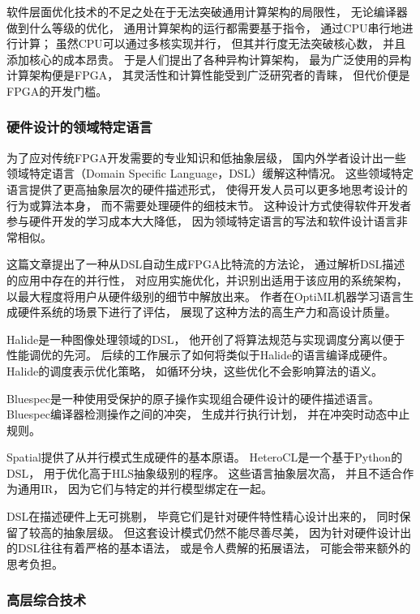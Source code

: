 软件层面优化技术的不足之处在于无法突破通用计算架构的局限性，
无论编译器做到什么等级的优化，
通用计算架构的运行都需要基于指令，
通过CPU串行地进行计算；
虽然CPU可以通过多核实现并行，
但其并行度无法突破核心数，
并且添加核心的成本昂贵。
于是人们提出了各种异构计算架构，
最为广泛使用的异构计算架构便是FPGA，
其灵活性和计算性能受到广泛研究者的青睐，
但代价便是FPGA的开发门槛。

\subsubsection{硬件设计的领域特定语言}

为了应对传统FPGA开发需要的专业知识和低抽象层级，
国内外学者设计出一些领域特定语言（Domain Specific Language，DSL）缓解这种情况。
这些领域特定语言提供了更高抽象层次的硬件描述形式，
使得开发人员可以更多地思考设计的行为或算法本身，
而不需要处理硬件的细枝末节。
这种设计方式使得软件开发者参与硬件开发的学习成本大大降低，
因为领域特定语言的写法和软件设计语言非常相似。

这篇文章\cite{dsl1}提出了一种从DSL自动生成FPGA比特流的方法论，
通过解析DSL描述的应用中存在的并行性，
对应用实施优化，并识别出适用于该应用的系统架构，
以最大程度将用户从硬件级别的细节中解放出来。
作者在OptiML机器学习语言生成硬件系统的场景下进行了评估，
展现了这种方法的高生产力和高设计质量。

Halide\cite{halide}是一种图像处理领域的DSL，
他开创了将算法规范与实现调度分离以便于性能调优的先河。
后续的工作展示了如何将类似于Halide的语言编译成硬件。
Halide的调度表示优化策略，
如循环分块，这些优化不会影响算法的语义。

Bluespec\cite{bluespec}是一种使用受保护的原子操作实现组合硬件设计的硬件描述语言。
Bluespec编译器检测操作之间的冲突，
生成并行执行计划，
并在冲突时动态中止规则。

Spatial\cite{spatial}提供了从并行模式生成硬件的基本原语。
HeteroCL\cite{heterocl}是一个基于Python的DSL，
用于优化高于HLS抽象级别的程序。
这些语言抽象层次高，
并且不适合作为通用IR，
因为它们与特定的并行模型绑定在一起。

DSL在描述硬件上无可挑剔，
毕竟它们是针对硬件特性精心设计出来的，
同时保留了较高的抽象层级。
但这套设计模式仍然不能尽善尽美，
因为针对硬件设计出的DSL往往有着严格的基本语法，
或是令人费解的拓展语法，
可能会带来额外的思考负担。

\subsubsection{高层综合技术}

